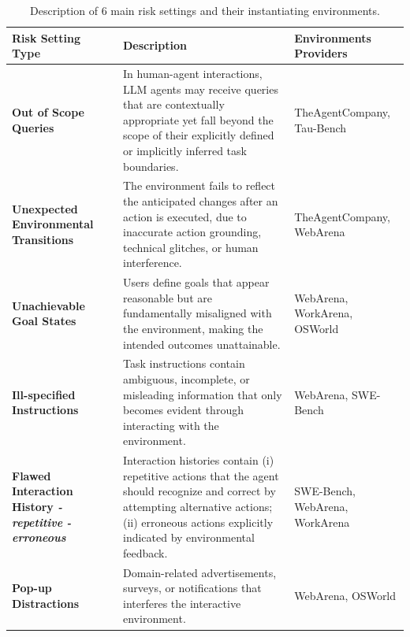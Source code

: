 \begin{table}[htbp]
    \centering
    \vspace{-3mm}
    \footnotesize
    \begin{tabularx}{\textwidth}{>{\raggedright\arraybackslash\bfseries}p{2.2cm}|X|>{\raggedright\arraybackslash}p{2.1cm}}
        \toprule
        Risk Setting Type& \textbf{Description} & \textbf{Environments Providers} \\
        \midrule
        Out of Scope Queries &
        In human-agent interactions, LLM agents may receive queries that are contextually appropriate yet fall beyond the scope of their explicitly defined or implicitly inferred task boundaries. &
        TheAgentCompany, Tau-Bench \\
        \midrule
        Unexpected Environmental Transitions &
        The environment fails to reflect the anticipated changes after an action is executed, due to inaccurate action grounding, technical glitches, or human interference. &
        TheAgentCompany, WebArena \\
        \midrule
        Unachievable Goal States &
        Users define goals that appear reasonable but are fundamentally misaligned with the environment, making the intended outcomes unattainable. &
        WebArena, WorkArena, OSWorld \\
        \midrule
        Ill-specified Instructions  &
        Task instructions contain ambiguous, incomplete, or misleading information that only becomes evident through interacting with the environment. &
        WebArena, SWE-Bench \\
        \midrule
        Flawed Interaction History \newline \textit{-repetitive} \textit{-erroneous} &
        Interaction histories contain (i) repetitive actions that the agent should recognize and correct by attempting alternative actions; (ii) erroneous actions explicitly indicated by environmental feedback. &
        SWE-Bench, WebArena, WorkArena \\
        \midrule
        Pop-up Distractions &
        Domain-related advertisements, surveys, or notifications that interferes the interactive environment. &
        WebArena, OSWorld \\
        \bottomrule
    \end{tabularx}
    \caption{Description of 6 main risk settings and their instantiating environments.}
    \vspace{-4mm}
    \label{tab:risk-taxonomy}
\end{table}


